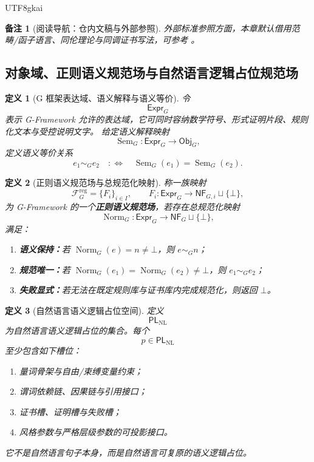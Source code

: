 \documentclass[12pt]{article}
\newtheorem{definition}{定义}[section]
\newtheorem{remark}{备注}[section]
\newcommand{\GFramework}{\textsf{G-Framework}}
\newcommand{\Sem}{\operatorname{Sem}}
\newcommand{\Norm}{\operatorname{Norm}}
\begin{document}
\begin{CJK*}{UTF8}{gkai}
\begin{remark}[阅读导航：仓内文稿与外部参照]
外部标准参照方面，本章默认借用范畴/函子语言、同伦理论与同调证书写法，可参考
\cite{MacLane1998Categories,Hatcher2002AT,Weibel1994HomologicalAlgebra,KobayashiNomizu1963Foundations}。
\end{remark}

\subsection{对象域、正则语义规范场与自然语言逻辑占位规范场}
\label{subsec:tex37-objects}

\begin{definition}[G 框架表达域、语义解释与语义等价]
令
\[
  \mathsf{Expr}_G
\]
表示 \GFramework{} 允许的表达域，它可同时容纳数学符号、形式证明片段、规则化文本与受控说明文字。
给定语义解释映射
\[
  \Sem_G:\mathsf{Expr}_G\to\mathsf{Obj}_G,
\]
定义语义等价关系
\[
  e_1\sim_G e_2
  \quad:\Longleftrightarrow\quad
  \Sem_G(e_1)=\Sem_G(e_2).
\]
\end{definition}

\begin{definition}[正则语义规范场与总规范化映射]
称一族映射
\[
  \mathcal{F}^{\mathrm{reg}}_G=\{F_i\}_{i\in I},
  \qquad
  F_i:\mathsf{Expr}_G\to \mathsf{NF}_{G,i}\sqcup\{\bot\},
\]
为 \GFramework{} 的一个\textbf{正则语义规范场}，若存在总规范化映射
\[
  \Norm_G:\mathsf{Expr}_G\to \mathsf{NF}_G\sqcup\{\bot\},
\]
满足：
\begin{enumerate}
  \item \textbf{语义保持：}若 $\Norm_G(e)=n\neq\bot$，则 $e\sim_G n$；
  \item \textbf{规范唯一：}若 $\Norm_G(e_1)=\Norm_G(e_2)\neq\bot$，则 $e_1\sim_G e_2$；
  \item \textbf{失败显式：}若无法在既定规则库与证书库内完成规范化，则返回 $\bot$。
\end{enumerate}
\end{definition}

\begin{definition}[自然语言语义逻辑占位空间]
\label{def:tex37-placeholder-space}
定义
\[
  \mathsf{PL}_{\mathrm{NL}}
\]
为自然语言语义逻辑占位的集合。每个
\[
  p\in \mathsf{PL}_{\mathrm{NL}}
\]
至少包含如下槽位：
\begin{enumerate}
  \item 量词骨架与自由/束缚变量约束；
  \item 谓词依赖链、因果链与引用接口；
  \item 证书槽、证明槽与失败槽；
  \item 风格参数与严格层级参数的可投影接口。
\end{enumerate}
它不是自然语言句子本身，而是自然语言可复原的语义逻辑占位。
\end{definition}


\end{CJK*}
\end{document}
